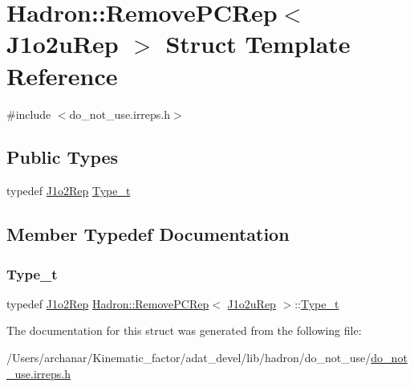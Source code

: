 \hypertarget{structHadron_1_1RemovePCRep_3_01J1o2uRep_01_4}{}\section{Hadron\+:\+:Remove\+P\+C\+Rep$<$ J1o2u\+Rep $>$ Struct Template Reference}
\label{structHadron_1_1RemovePCRep_3_01J1o2uRep_01_4}


{\ttfamily \#include $<$do\+\_\+not\+\_\+use.\+irreps.\+h$>$}

\subsection*{Public Types}
\begin{DoxyCompactItemize}
\item 
typedef \mbox{\hyperlink{structHadron_1_1J1o2Rep}{J1o2\+Rep}} \mbox{\hyperlink{structHadron_1_1RemovePCRep_3_01J1o2uRep_01_4_a3bd356cdbefa21f279a298dcc9872b6a}{Type\+\_\+t}}
\end{DoxyCompactItemize}


\subsection{Member Typedef Documentation}
\mbox{\label{structHadron_1_1RemovePCRep_3_01J1o2uRep_01_4_a3bd356cdbefa21f279a298dcc9872b6a}} 
\subsubsection{\texorpdfstring{Type\_t}{Type\_t}}
{\footnotesize\ttfamily typedef \mbox{\hyperlink{structHadron_1_1J1o2Rep}{J1o2\+Rep}} \mbox{\hyperlink{structHadron_1_1RemovePCRep}{Hadron\+::\+Remove\+P\+C\+Rep}}$<$ \mbox{\hyperlink{structHadron_1_1J1o2uRep}{J1o2u\+Rep}} $>$\+::\mbox{\hyperlink{structHadron_1_1RemovePCRep_3_01J1o2uRep_01_4_a3bd356cdbefa21f279a298dcc9872b6a}{Type\+\_\+t}}}



The documentation for this struct was generated from the following file\+:\begin{DoxyCompactItemize}
\item 
/\+Users/archanar/\+Kinematic\+\_\+factor/adat\+\_\+devel/lib/hadron/do\+\_\+not\+\_\+use/\mbox{\hyperlink{do__not__use_8irreps_8h}{do\+\_\+not\+\_\+use.\+irreps.\+h}}\end{DoxyCompactItemize}
